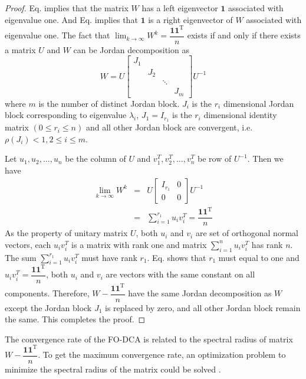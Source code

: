 \begin{proof}
Eq. implies that the matrix $W$
has a left eigenvector $\mathbf{1}$ associated with eigenvalue one.
And Eq. implies that $\mathbf{1}$
is a right eigenvector of $W$ associated with eigenvalue one. The
fact that $\lim_{k\rightarrow\infty}W^{k}=\dfrac{\mathbf{11}^{\mathrm{T}}}{n}$
exists if and only if there exists a  matrix $U$ and $W$ can be
Jordan decomposition as 
\begin{equation}
W=U\left[\begin{array}{cccc}
J_{1}\\
 & J_{2}\\
 &  & \ddots\\
 &  &  & J_{m}
\end{array}\right]U^{-1}
\end{equation}
where $m$ is the number of distinct Jordan block. $J_{i}$ is the
$r_{i}$ dimensional Jordan block corresponding to eigenvalue $\lambda_{i}$,
$J_{1}=I_{r_{1}}$ is the $r_{i}$ dimensional identity matrix $\left(0\leq r_{i}\leq n\right)$
and all other Jordan block are convergent, i.e. $\rho\left(J_{i}\right)<1,2\leq i\leq m$.

Let $u_{1},u_{2},\ldots,u_{n}$ be the column of $U$ and $v_{1}^{T},v_{2}^{T},\ldots,v_{n}^{T}$
be row of $U^{-1}$. Then we have 
\begin{eqnarray}
\lim_{k\to\infty}W^{k} & = & U\left[\begin{array}{cc}
I_{r_{1}} & 0\\
0 & 0
\end{array}\right]U^{-1}\label{eq: W^k to infinity has Rank one}\\
 & = & \sum_{i=1}^{r_{1}}u_{i}v_{i}^{T}=\dfrac{\mathbf{11}^{\mathrm{T}}}{n}\label{eq:u*v=00003D11}
\end{eqnarray}
As the property of unitary matrix $U$, both $u_{i}$ and $v_{i}$
are set of orthogonal normal vectors, each $u_{i}v_{i}^{T}$ is a
matrix with rank one and matrix $\sum_{i=1}^{n}u_{i}v_{i}^{T}$ has
rank $n$. The sum $\sum_{i=1}^{r_{1}}u_{i}v_{i}^{T}$ must have rank
$r_{1}.$ Eq. shows that $r_{1}$ must equal
to one and $u_{i}v_{i}^{T}=\dfrac{\mathbf{11}^{\mathrm{T}}}{n}$,
both $u_{i}$ and $v_{i}$ are vectors with the same constant on all
components. Therefore, $W-\dfrac{\mathbf{11}^{\mathrm{T}}}{n}$ have
the same Jordan decomposition as $W$ except the Jordan block $J_{1}$
is replaced by zero, and all other Jordan block remain the same. This
completes the proof. 
\end{proof}
The convergence rate of the FO-DCA is related to the spectral radius
of matrix $W-\dfrac{\mathbf{11}^{\mathrm{T}}}{n}$. To get the maximum
convergence rate, an optimization problem to minimize the spectral
radius of the matrix could be solved \cite{Xiao2004}. 

